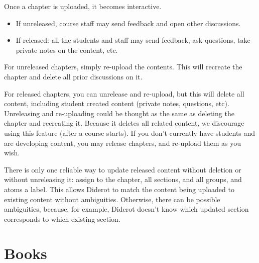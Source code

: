 \begin{gram}
Once a chapter is uploaded, it becomes interactive.

\begin{itemize}
\item
If unreleased, course staff may send feedback and open other discussions. 
\item
If released: all the students and staff may send feedback, ask questions, take private notes on the content, etc.
\end{itemize}
\end{gram}


\begin{gram}
For unreleased chapters, simply re-upload the contents.  This will
recreate the chapter and delete all prior discussions on it.  

For released chapters, you can unrelease and re-upload, but this will
delete all content, including student created content (private notes,
questions, etc). 
%
Unreleasing and re-uploading could be thought as the same as deleting the chapter and recreating it.
%
Because it deletes all related content, we discourage using this
feature (after a course starts).  If you don't currently have students and are developing content, you may release chapters, and re-upload them as you wish.

There is only one reliable way to update released content without deletion or without unreleasing it: assign to the chapter, all sections, and all groups, and atoms a label.  This allows Diderot to match the content being uploaded to existing content without ambiguities.  Otherwise, there can be possible ambiguities, because, for example, Diderot doesn't know which updated section corresponds to which existing section. 
\end{gram}

\section{Books}
\label{guide:books}

